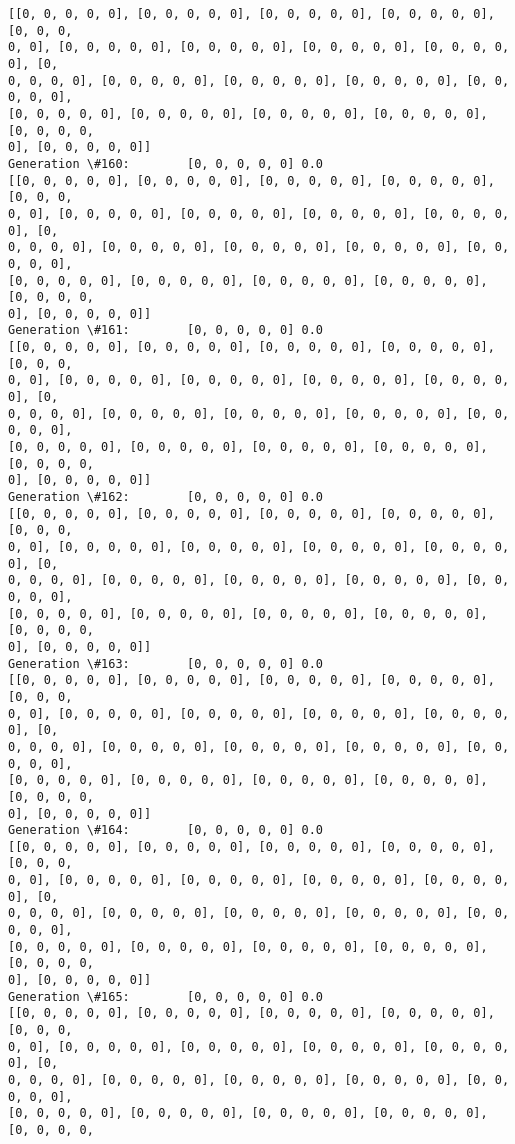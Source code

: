 \documentclass[11pt]{article}
\begin{document}
\begin{Verbatim}[commandchars=\\\{\}]
[[0, 0, 0, 0, 0], [0, 0, 0, 0, 0], [0, 0, 0, 0, 0], [0, 0, 0, 0, 0], [0, 0, 0,
0, 0], [0, 0, 0, 0, 0], [0, 0, 0, 0, 0], [0, 0, 0, 0, 0], [0, 0, 0, 0, 0], [0,
0, 0, 0, 0], [0, 0, 0, 0, 0], [0, 0, 0, 0, 0], [0, 0, 0, 0, 0], [0, 0, 0, 0, 0],
[0, 0, 0, 0, 0], [0, 0, 0, 0, 0], [0, 0, 0, 0, 0], [0, 0, 0, 0, 0], [0, 0, 0, 0,
0], [0, 0, 0, 0, 0]]
Generation \#160:        [0, 0, 0, 0, 0] 0.0
[[0, 0, 0, 0, 0], [0, 0, 0, 0, 0], [0, 0, 0, 0, 0], [0, 0, 0, 0, 0], [0, 0, 0,
0, 0], [0, 0, 0, 0, 0], [0, 0, 0, 0, 0], [0, 0, 0, 0, 0], [0, 0, 0, 0, 0], [0,
0, 0, 0, 0], [0, 0, 0, 0, 0], [0, 0, 0, 0, 0], [0, 0, 0, 0, 0], [0, 0, 0, 0, 0],
[0, 0, 0, 0, 0], [0, 0, 0, 0, 0], [0, 0, 0, 0, 0], [0, 0, 0, 0, 0], [0, 0, 0, 0,
0], [0, 0, 0, 0, 0]]
Generation \#161:        [0, 0, 0, 0, 0] 0.0
[[0, 0, 0, 0, 0], [0, 0, 0, 0, 0], [0, 0, 0, 0, 0], [0, 0, 0, 0, 0], [0, 0, 0,
0, 0], [0, 0, 0, 0, 0], [0, 0, 0, 0, 0], [0, 0, 0, 0, 0], [0, 0, 0, 0, 0], [0,
0, 0, 0, 0], [0, 0, 0, 0, 0], [0, 0, 0, 0, 0], [0, 0, 0, 0, 0], [0, 0, 0, 0, 0],
[0, 0, 0, 0, 0], [0, 0, 0, 0, 0], [0, 0, 0, 0, 0], [0, 0, 0, 0, 0], [0, 0, 0, 0,
0], [0, 0, 0, 0, 0]]
Generation \#162:        [0, 0, 0, 0, 0] 0.0
[[0, 0, 0, 0, 0], [0, 0, 0, 0, 0], [0, 0, 0, 0, 0], [0, 0, 0, 0, 0], [0, 0, 0,
0, 0], [0, 0, 0, 0, 0], [0, 0, 0, 0, 0], [0, 0, 0, 0, 0], [0, 0, 0, 0, 0], [0,
0, 0, 0, 0], [0, 0, 0, 0, 0], [0, 0, 0, 0, 0], [0, 0, 0, 0, 0], [0, 0, 0, 0, 0],
[0, 0, 0, 0, 0], [0, 0, 0, 0, 0], [0, 0, 0, 0, 0], [0, 0, 0, 0, 0], [0, 0, 0, 0,
0], [0, 0, 0, 0, 0]]
Generation \#163:        [0, 0, 0, 0, 0] 0.0
[[0, 0, 0, 0, 0], [0, 0, 0, 0, 0], [0, 0, 0, 0, 0], [0, 0, 0, 0, 0], [0, 0, 0,
0, 0], [0, 0, 0, 0, 0], [0, 0, 0, 0, 0], [0, 0, 0, 0, 0], [0, 0, 0, 0, 0], [0,
0, 0, 0, 0], [0, 0, 0, 0, 0], [0, 0, 0, 0, 0], [0, 0, 0, 0, 0], [0, 0, 0, 0, 0],
[0, 0, 0, 0, 0], [0, 0, 0, 0, 0], [0, 0, 0, 0, 0], [0, 0, 0, 0, 0], [0, 0, 0, 0,
0], [0, 0, 0, 0, 0]]
Generation \#164:        [0, 0, 0, 0, 0] 0.0
[[0, 0, 0, 0, 0], [0, 0, 0, 0, 0], [0, 0, 0, 0, 0], [0, 0, 0, 0, 0], [0, 0, 0,
0, 0], [0, 0, 0, 0, 0], [0, 0, 0, 0, 0], [0, 0, 0, 0, 0], [0, 0, 0, 0, 0], [0,
0, 0, 0, 0], [0, 0, 0, 0, 0], [0, 0, 0, 0, 0], [0, 0, 0, 0, 0], [0, 0, 0, 0, 0],
[0, 0, 0, 0, 0], [0, 0, 0, 0, 0], [0, 0, 0, 0, 0], [0, 0, 0, 0, 0], [0, 0, 0, 0,
0], [0, 0, 0, 0, 0]]
Generation \#165:        [0, 0, 0, 0, 0] 0.0
[[0, 0, 0, 0, 0], [0, 0, 0, 0, 0], [0, 0, 0, 0, 0], [0, 0, 0, 0, 0], [0, 0, 0,
0, 0], [0, 0, 0, 0, 0], [0, 0, 0, 0, 0], [0, 0, 0, 0, 0], [0, 0, 0, 0, 0], [0,
0, 0, 0, 0], [0, 0, 0, 0, 0], [0, 0, 0, 0, 0], [0, 0, 0, 0, 0], [0, 0, 0, 0, 0],
[0, 0, 0, 0, 0], [0, 0, 0, 0, 0], [0, 0, 0, 0, 0], [0, 0, 0, 0, 0], [0, 0, 0, 0,

\end{Verbatim}
\end{document}
